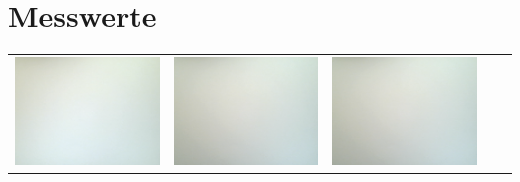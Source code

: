 \section{Messwerte}
\label{chap:VERSUCH_3_MESSWERTE}

\begin{tabular}{c c c c c}

\includegraphics[scale=0.11]{media/weissbilder/weissbild_0.png}
 & 
\includegraphics[scale=0.11]{media/weissbilder/weissbild_1.png}
 &
\includegraphics[scale=0.11]{media/weissbilder/weissbild_2.png}

\end{tabular}
